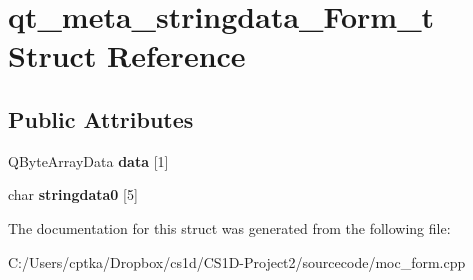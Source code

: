 \hypertarget{structqt__meta__stringdata___form__t}{}\section{qt\+\_\+meta\+\_\+stringdata\+\_\+\+Form\+\_\+t Struct Reference}
\label{structqt__meta__stringdata___form__t}
\subsection*{Public Attributes}
\begin{DoxyCompactItemize}
\item 
\mbox{\label{structqt__meta__stringdata___form__t_a1813384460d0d3d53d3b94e9249d620f}} 
Q\+Byte\+Array\+Data {\bfseries data} \mbox{[}1\mbox{]}
\item 
\mbox{\label{structqt__meta__stringdata___form__t_a6b83754aaa61f7b0a2607e27ef8e8c95}} 
char {\bfseries stringdata0} \mbox{[}5\mbox{]}
\end{DoxyCompactItemize}


The documentation for this struct was generated from the following file\+:\begin{DoxyCompactItemize}
\item 
C\+:/\+Users/cptka/\+Dropbox/cs1d/\+C\+S1\+D-\/\+Project2/sourcecode/moc\+\_\+form.\+cpp\end{DoxyCompactItemize}
